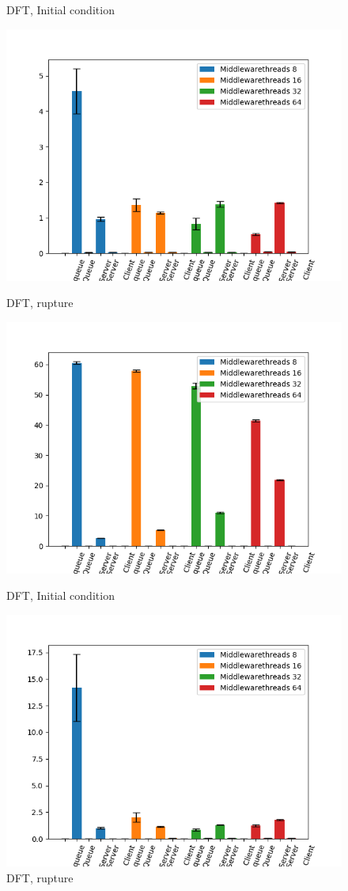 \documentclass[11pt,a4paper]{article}
\begin{document}
\begin{figure}[!ht]
\begin{minipage}[b]{0.5\linewidth}
    \caption{DFT, Initial condition} 
    \vspace{4ex}
  \end{minipage}%
  \begin{minipage}[b]{0.5\linewidth}
    \centering
    \includegraphics[width=0.7\linewidth]{img/exp3_1/exp3_1_mw_percentile_plots_writes_1__vc_16.png} 
    \caption{DFT, rupture} 
    \vspace{4ex}
  \end{minipage} 
    \begin{minipage}[b]{0.5\linewidth}
    \centering
    \includegraphics[width=0.7\linewidth]{img/exp3_1/exp3_1_mw_percentile_plots_writes_0__vc_32.png} 
    \caption{DFT, Initial condition} 
    \vspace{4ex}
  \end{minipage}%
  \begin{minipage}[b]{0.5\linewidth}
    \centering
    \includegraphics[width=0.7\linewidth]{img/exp3_1/exp3_1_mw_percentile_plots_writes_1__vc_32.png} 
    \caption{DFT, rupture} 
    \vspace{4ex}
  \end{minipage} 
\end{figure}
\end{document}
